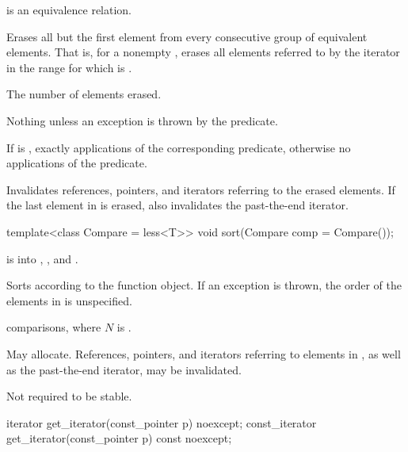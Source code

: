 \begin{itemdescr}
\pnum
\expects
{} is an equivalence relation.

\pnum
\effects
Erases all but the first element
from every consecutive group of equivalent elements.
That is, for a nonempty ,
erases all elements referred to by the iterator 
in the range 
for which  is .

\pnum
\returns
The number of elements erased.

\pnum
\throws
Nothing unless an exception is thrown by the predicate.

\pnum
\complexity
If  is ,
exactly  applications of the corresponding predicate,
otherwise no applications of the predicate.

\pnum
\remarks
Invalidates references, pointers, and iterators
referring to the erased elements.
If the last element in  is erased,
also invalidates the past-the-end iterator.
\end{itemdescr}

%
\begin{itemdecl}
template<class Compare = less<T>>
  void sort(Compare comp = Compare());
\end{itemdecl}

\begin{itemdescr}
\pnum
\expects
{} is  into ,
, and .

\pnum
\effects
Sorts  according to the  function object.
If an exception is thrown,
the order of the elements in  is unspecified.

\pnum
\complexity
{} comparisons, where $N$ is .

\pnum
\remarks
May allocate.
References, pointers, and iterators referring to elements in ,
as well as the past-the-end iterator, may be invalidated.
\begin{note}
Not required to be stable.
\end{note}
\end{itemdescr}

%
\begin{itemdecl}
iterator get_iterator(const_pointer p) noexcept;
const_iterator get_iterator(const_pointer p) const noexcept;
\end{itemdecl}

